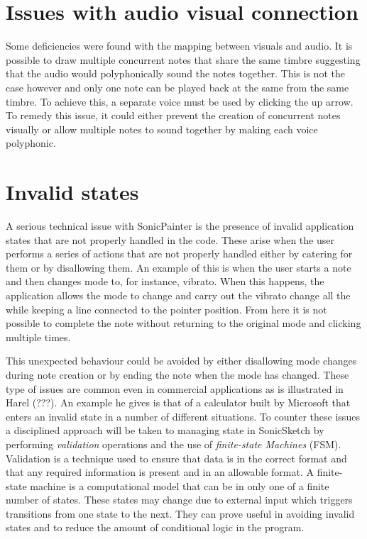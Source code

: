 \documentclass[12pt]{report}
\begin{document}
\section{Issues with audio visual connection}
\label{sec:org52e03e7}
Some deficiencies were found with the mapping between visuals and audio. It is
possible to draw multiple concurrent notes that share the same timbre suggesting
that the audio would polyphonically sound the notes together. This is not the
case however and only one note can be played back at the same from the same
timbre. To achieve this, a separate voice must be used by clicking the up arrow.
To remedy this issue, it could either prevent the creation of concurrent notes
visually or allow multiple notes to sound together by making each voice
polyphonic.

\section{Invalid states}
\label{sec:org9d9edf9}
A serious technical issue with SonicPainter is the presence of invalid
application states that are not properly handled in the code. These arise when
the user performs a series of actions that are not properly handled either by
catering for them or by disallowing them. An example of this is when the user
starts a note and then changes mode to, for instance, vibrato. When this
happens, the application allows the mode to change and carry out the vibrato
change all the while keeping a line connected to the pointer position. From here
it is not possible to complete the note without returning to the original mode
and clicking multiple times.

This unexpected behaviour could be avoided by either disallowing mode changes
during note creation or by ending the note when the mode has changed. These type
of issues are common even in commercial applications as is illustrated in Harel
(???). An example he gives is that of a calculator built by Microsoft that
enters an invalid state in a number of different situations. To counter these
issues a disciplined approach will be taken to managing state in SonicSketch by
performing \emph{validation} operations and the use of \emph{finite-state Machines} (FSM).
Validation is a technique used to ensure that data is in the correct format and
that any required information is present and in an allowable format. A
finite-state machine is a computational model that can be in only one of a
finite number of states. These states may change due to external input which
triggers transitions from one state to the next. They can prove useful in
avoiding invalid states and to reduce the amount of conditional logic in the
program.
\end{document}
